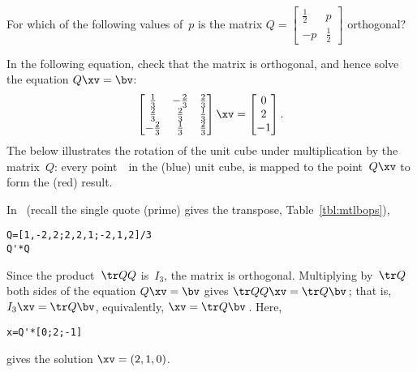 \begin{activity}
For which of the following values of~\(p\) is the matrix \(Q=\begin{bmatrix} \frac12&p\\-p&\frac12 \end{bmatrix}\) orthogonal?
\end{activity}



\begin{example} \label{eg:3dorthog}
In the following equation, check that the matrix is orthogonal, and hence solve the equation \(Q\xv=\bv\):
\begin{equation*}
\begin{bmatrix} \frac13&-\frac23&\frac23
\\\frac23&\frac23&\frac13
\\-\frac23&\frac13&\frac23 \end{bmatrix}\xv
=\begin{bmatrix} 0\\2\\-1 \end{bmatrix}.
\end{equation*} 
The  below illustrates the rotation of the unit cube under multiplication by the matrix~\(Q\): every point~\xv\ in the (blue) unit cube, is mapped to the point~\(Q\xv\) to form the (red) result.
\begin{center}
\def\unithousesize{footnotesize,height=5.5cm}
\end{center}
\begin{solution} In \script\ (recall the single quote (prime) gives the transpose, Table~\ref{tbl:mtlbops}),
\begin{verbatim}
Q=[1,-2,2;2,2,1;-2,1,2]/3
Q'*Q
\end{verbatim}
Since the product~\(\tr QQ\) is~\(I_3\), the matrix is orthogonal.  
Multiplying by~\(\tr Q\) both sides of the equation \(Q\xv=\bv\) gives \(\tr QQ\xv=\tr Q\bv\)\,; that is, \(I_3\xv=\tr Q\bv\), equivalently, \(\xv=\tr Q\bv\)\,.
Here,
\begin{verbatim}
x=Q'*[0;2;-1]
\end{verbatim}
\setbox\ajrqrbox\hbox{}%
\marginpar{\usebox{\ajrqrbox}}%
gives the solution \(\xv=(2,1,0)\).
\end{solution}
\end{example}


